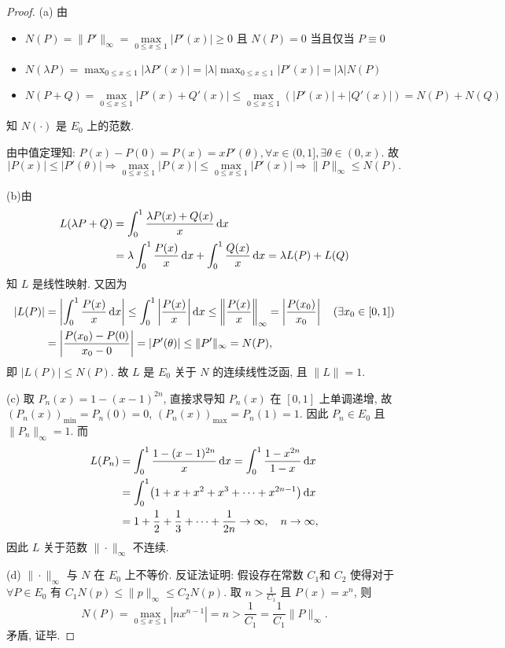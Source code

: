\begin{proof}
  (a) 由
  \begin{itemize}
  \item $N(P)=\|P'\|_{\infty}=\max\limits_{0\leq x\leq 1}|P'(x)|\geq 0$
    且 $N(P)=0$ 当且仅当 $P\equiv 0$
  \item $N(\lambda P)=\max_{0\leq x\leq 1}|\lambda P'(x)|=|\lambda|\max_{0\leq x\leq 1}|P'(x)|=|\lambda|N(P)$
  \item $N(P+Q)=\max\limits_{0\leq x\leq 1}|P'(x)+Q'(x)|\leq\max\limits_{0\leq x\leq 1}(|P'(x)|+|Q'(x)|)=N(P)+N(Q)$
  \end{itemize}
  知 $N(\cdot)$ 是 $E_0$ 上的范数.

  由中值定理知: $P(x)-P(0)=P(x)=xP'(\theta),\forall x\in (0,1],\exists\theta\in (0,x)$. 故
  \[|P(x)|\leq |P'(\theta)|\Rightarrow\max_{0\leq x\leq 1}|P(x)|\leq\max_{0\leq x\leq 1}|P'(x)|\Rightarrow \|P\|_{\infty}\leq N(P).\]

  (b)由
  \begin{align*}
      L(\lambda P+Q)
      & =\int_0^1\frac{\lambda P(x)+Q(x)}{x}\mathop{}\!\mathrm{d} x \\
      & =\lambda\int_0^1\frac{P(x)}{x}\mathop{}\!\mathrm{d} x+\int_0^1\frac{Q(x)}{x}\mathop{}\!\mathrm{d} x=\lambda L(P)+L(Q)
  \end{align*}
  知 $L$ 是线性映射. 又因为
  \begin{align*}
  |L(P)|
  &=\left|\int_0^1\frac{P(x)}{x}\mathop{}\!\mathrm{d} x\right|\leq\int_0^1\left|\frac{P(x)}{x}\right|\mathop{}\!\mathrm{d} x\leq\left\|\frac{P(x)}{x}\right\|_{\infty}=\left\lvert\frac{P(x_0)}{x_0}\right\rvert\quad(\exists x_0\in [0,1])\\
  &=\left\lvert\frac{P(x_0)-P(0)}{x_0-0}\right\rvert=|P'(\theta)|\leq\|P'\|_{\infty}=N(P),
  \end{align*}
  即 $|L(P)|\leq N(P)$.
  故 $L$ 是 $E_0$ 关于 $N$ 的连续线性泛函, 且 $\|L\|=1$.

  (c) 取 $P_n(x) = 1 - (x-1)^{2n}$, 直接求导知 $P_n(x)$ 在 $[0,1]$
  上单调递增, 故 $(P_n(x))_{\min} = P_n(0) = 0$, $(P_n(x))_{\max} = P_n(1) = 1$.
  因此 $P_n\in E_0$ 且 $\|P_n\|_{\infty} = 1$. 而
  \begin{align*}
    L(P_n)
    & = \int_0^1 \frac{1-(x-1)^{2n}}{x} \mathop{}\!\mathrm{d} x
      = \int_0^1 \frac{1-x^{2n}}{1-x} \mathop{}\!\mathrm{d} x \\
    & = \int_0^1 \bigl(1 + x + x^2 + x^3 + \cdots + x^{2n-1}\bigr) \mathop{}\!\mathrm{d} x \\
    & = 1 + \frac12 + \frac13 + \cdots + \frac{1}{2n} \to \infty,\quad n\to\infty,
  \end{align*}
  因此 $L$ 关于范数 $\|\cdot\|_\infty$ 不连续.

  (d) $\|\cdot\|_{\infty}$ 与 $N$ 在 $E_0$ 上不等价.
  反证法证明: 
  假设存在常数 $C_1 $和 $C_2$ 使得对于 $\forall P\in E_0$ 
  有 $C_1N(p)\leq\|p\|_{\infty}\leq C_2N(p)$. 取 $n>\frac{1}{C_1}$ 且 $P(x)=x^n$, 则
  \[N(P)=\max_{0\leq x\leq 1}|nx^{n-1}|=n>\frac{1}{C_1}=\frac{1}{C_1}\|P\|_{\infty}.\]
  矛盾, 证毕.
\end{proof}


